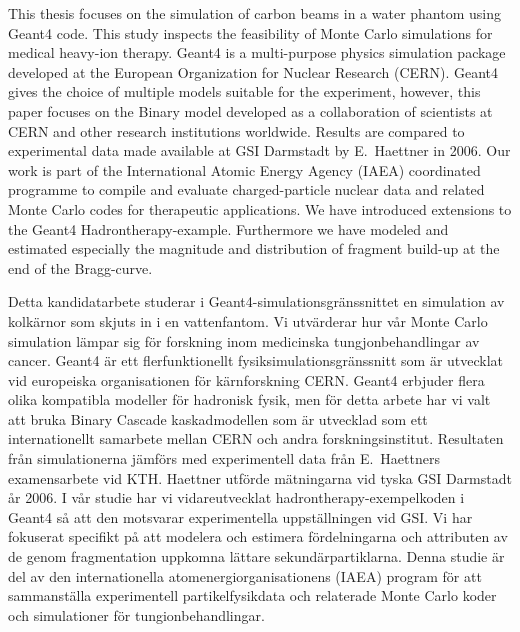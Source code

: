 
\makecoverpage

\begin{abstractpage}[english]
This thesis focuses on the simulation of carbon beams in a water phantom using Geant4 code. This study inspects the feasibility of Monte Carlo simulations for medical heavy-ion therapy. Geant4 is a multi-purpose physics simulation package developed at the European Organization for Nuclear Research (CERN). Geant4 gives the choice of multiple models suitable for the experiment, however, this paper focuses on the Binary model developed as a collaboration of scientists at CERN and other research institutions worldwide. Results are compared to experimental data made available at GSI Darmstadt by E.~Haettner in 2006. Our work is part of the International Atomic Energy Agency (IAEA) coordinated programme to compile and evaluate charged-particle nuclear data and related Monte Carlo codes for therapeutic applications. We have introduced extensions to the Geant4 Hadrontherapy-example. Furthermore we have modeled and estimated especially the magnitude and distribution of fragment build-up at the end of the Bragg-curve.
\end{abstractpage}
\begin{abstractpage}[swedish]
Detta kandidatarbete studerar i Geant4-simulationsgränssnittet en simulation av kolkärnor som skjuts in i en vattenfantom. Vi utvärderar hur vår Monte Carlo simulation lämpar sig för forskning inom medicinska tungjonbehandlingar av cancer. Geant4 är ett flerfunktionellt fysiksimulationsgränssnitt som är utvecklat vid europeiska organisationen för kärnforskning CERN. Geant4 erbjuder flera olika kompatibla modeller för hadronisk fysik, men för detta arbete har vi valt att bruka Binary Cascade kaskadmodellen som är utvecklad som ett internationellt samarbete mellan CERN och andra forskningsinstitut. Resultaten från simulationerna jämförs med experimentell data från E.~Haettners examensarbete vid KTH. Haettner utförde mätningarna vid tyska GSI Darmstadt år 2006. I vår studie har vi vidareutvecklat hadrontherapy-exempelkoden i Geant4 så att den motsvarar experimentella uppställningen vid GSI. Vi har fokuserat specifikt på att modelera och estimera fördelningarna och attributen av de genom fragmentation uppkomna lättare sekundärpartiklarna. Denna studie är del av den internationella atomenergiorganisationens (IAEA) program för att sammanställa experimentell partikelfysikdata och relaterade Monte Carlo koder och simulationer för tungionbehandlingar.
\end{abstractpage}

